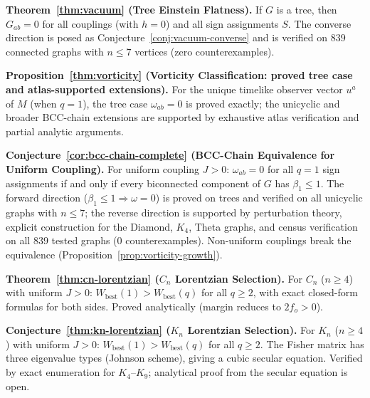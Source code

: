 \documentclass[11pt]{article}
\theoremstyle{definition}
\theoremstyle{remark}
\newcommand{\sgn}{S}
\newcommand{\Met}{M}
\newcommand{\obs}{u}
\newcommand{\vort}{\omega}
\newcommand{\betti}{\beta_1}
\newcommand{\Ein}{G}
\begin{document}
\medskip
\noindent\textbf{Theorem~\ref{thm:vacuum} (Tree Einstein Flatness).}
If $G$ is a tree, then $\Ein_{ab} = 0$ for all couplings (with $h = 0$)
and all sign assignments $\sgn$. The converse direction is posed as
Conjecture~\ref{conj:vacuum-converse} and is verified on $839$ connected
graphs with $n \leq 7$ vertices (zero counterexamples).

\medskip
\noindent\textbf{Proposition~\ref{thm:vorticity} (Vorticity Classification:
proved tree case and atlas-supported extensions).}
For the unique timelike observer vector $\obs^a$ of $\Met$ (when $q = 1$),
the tree case $\vort_{ab} = 0$ is proved exactly; the unicyclic and
broader BCC-chain extensions are supported by exhaustive atlas
verification and partial analytic arguments.

\medskip
\noindent\textbf{Conjecture~\ref{cor:bcc-chain-complete} (BCC-Chain Equivalence
for Uniform Coupling).}
For uniform coupling $J > 0$: $\vort_{ab} = 0$ for all $q = 1$ sign
assignments if and only if every biconnected component of $G$ has
$\betti \leq 1$.  The forward direction ($\betti \leq 1 \Rightarrow \vort = 0$)
is proved on trees and verified on all unicyclic graphs with $n \leq 7$;
the reverse direction is supported by perturbation theory, explicit
construction for the Diamond, $K_4$, Theta graphs, and census
verification on all $839$ tested graphs ($0$ counterexamples).
Non-uniform couplings break the equivalence
(Proposition~\ref{prop:vorticity-growth}).

\medskip
\noindent\textbf{Theorem~\ref{thm:cn-lorentzian} ($C_n$ Lorentzian Selection).}
For $C_n$ ($n \geq 4$) with uniform $J > 0$: $W_{\mathrm{best}}(1) > W_{\mathrm{best}}(q)$
for all $q \geq 2$, with exact closed-form formulas for both sides.
Proved analytically (margin reduces to $2f_o > 0$).

\medskip
\noindent\textbf{Conjecture~\ref{thm:kn-lorentzian} ($K_n$ Lorentzian Selection).}
For $K_n$ ($n \geq 4$) with uniform $J > 0$: $W_{\mathrm{best}}(1) > W_{\mathrm{best}}(q)$
for all $q \geq 2$. The Fisher matrix has three eigenvalue types (Johnson
scheme), giving a cubic secular equation. Verified by exact enumeration
for $K_4$--$K_9$; analytical proof from the secular equation is open.
\end{document}
